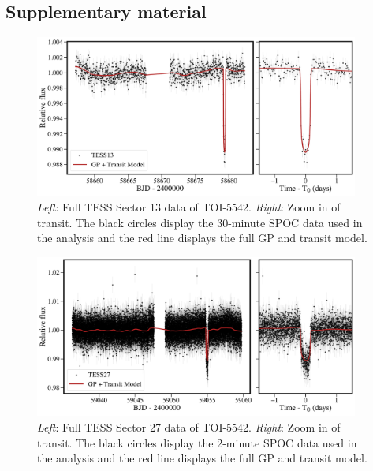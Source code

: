 \documentclass{aa}
\begin{document}
%
%




\begin{appendix} %
\section{Supplementary material}


\begin{figure}
  \centering
  \includegraphics[width=0.95\textwidth]{figures/transit_full_TOI-5542_TESS13.pdf}
 \caption{\textit{Left}: Full TESS Sector 13 data of TOI-5542. \textit{Right}: Zoom in of transit. The black circles display the 30-minute SPOC data used in the analysis and the red line displays the full GP and transit model.}
  \label{fig:TESS13_full}
\end{figure}

\begin{figure}
  \centering
  \includegraphics[width=0.95\textwidth]{figures/transit_full_TOI-5542_TESS27.pdf}
 \caption{\textit{Left}: Full TESS Sector 27 data of TOI-5542. \textit{Right}: Zoom in of transit. The black circles display the 2-minute SPOC data used in the analysis and the red line displays the full GP and transit model.}
  \label{fig:TESS27_full}
\end{figure}


\end{appendix}
\end{document}
